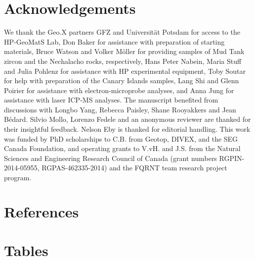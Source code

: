 \documentclass[review,authoryear,12pt]{elsarticle}
\begin{document}

\section*{Acknowledgements} 
We thank the Geo.X partners GFZ and Universit\"at Potsdam for access to the HP-GeoMatS Lab, Don Baker for assistance with preparation of starting materials, Bruce Watson and Volker M\"oller for providing samples of Mud Tank zircon and the Nechalacho rocks, respectively, Hans Peter Nabein, Maria Stuff and Julia Pohlenz for assistance with HP experimental equipment, Toby Soutar for help with preparation of the Canary Islands samples, Lang Shi and Glenn Poirier for assistance with electron-microprobe analyses, and Anna Jung for assistance with laser ICP-MS analyses. The manuscript benefited from discussions with Longbo Yang, Rebecca Paisley, Shane Rooyakkers and Jean B\'edard. Silvio Mollo, Lorenzo Fedele and an anonymous reviewer are thanked for their insightful feedback. Nelson Eby is thanked for editorial handling.
	This work was funded by PhD scholarships to C.B. from Geotop, DIVEX, and the SEG Canada Foundation, and operating grants to V.vH. and J.S. from the Natural Sciences and Engineering Research Council of Canada (grant numbers RGPIN-2014-05955, RGPAS-462335-2014) and the FQRNT team research project program.%
 
\section*{References}
%





\clearpage
\onecolumn
\section{Tables}
\end{document}
